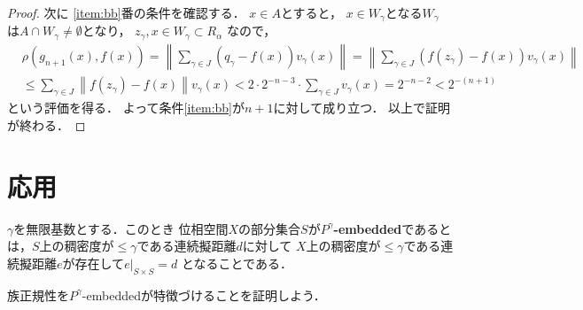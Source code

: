 \documentclass[leqno, a4paper, 12pt]{jsarticle}
\begin{document}
\begin{proof}
次に
\ref{item:bb}番の条件を確認する．
$x\in A$とすると，
$x\in W_{\gamma}$となる$W_{\gamma}$
は$A\cap W_{\gamma}\neq\emptyset$となり，
$z_{\gamma}, x\in W_{\gamma}\subset R_{\alpha}$
なので，
\begin{align*}
&\rho(g_{n+1}(x), f(x))=
\left\|\sum_{\gamma\in J}(q_{\gamma}-f(x))v_{\gamma}(x)\right\|
=\left\|\sum_{\gamma\in J}(f(z_{\gamma})-f(x))v_{\gamma}(x)\right\|\\
&\le 
\sum_{\gamma\in J}\left\|f(z_{\gamma})-f(x)\right\|v_{\gamma}(x)
< 2\cdot 2^{-n-3}\cdot \sum_{\gamma\in J}v_{\gamma}(x)=2^{-n-2}<2^{-(n+1)}
\end{align*}
という評価を得る．
よって条件\ref{item:bb}が$n+1$に対して成り立つ．
以上で証明が終わる．
\end{proof}

\section{応用}

$\gamma$を無限基数とする．このとき
位相空間$X$の部分集合$S$が\textbf{$P^{\gamma}$-embedded}であるとは，$S$上の稠密度が$\le \gamma$である連続擬距離$d$に対して
$X$上の稠密度が$\le \gamma$である連続擬距離$e$が存在して$e|_{S\times S}=d$
となることである．

族正規性を$P^{\gamma}$-embeddedが特徴づけることを証明しよう．
\end{document}
